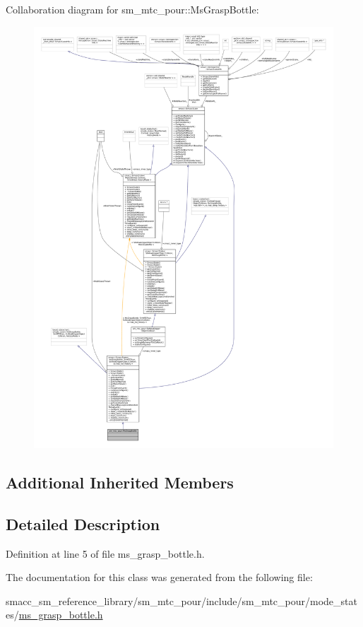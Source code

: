 Collaboration diagram for sm\+\_\+mtc\+\_\+pour\+:\+:Ms\+Grasp\+Bottle\+:
\nopagebreak
\begin{figure}[H]
\begin{center}
\leavevmode
\includegraphics[width=350pt]{classsm__mtc__pour_1_1MsGraspBottle__coll__graph}
\end{center}
\end{figure}
\subsection*{Additional Inherited Members}


\subsection{Detailed Description}


Definition at line 5 of file ms\+\_\+grasp\+\_\+bottle.\+h.



The documentation for this class was generated from the following file\+:\begin{DoxyCompactItemize}
\item 
smacc\+\_\+sm\+\_\+reference\+\_\+library/sm\+\_\+mtc\+\_\+pour/include/sm\+\_\+mtc\+\_\+pour/mode\+\_\+states/\hyperlink{ms__grasp__bottle_8h}{ms\+\_\+grasp\+\_\+bottle.\+h}\end{DoxyCompactItemize}
